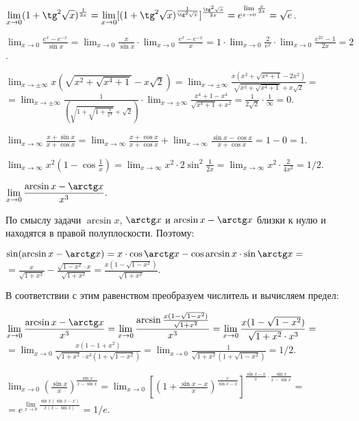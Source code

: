\documentclass[a5paper,10pt]{article}
\begin{document}
\medskip
{} $\displaystyle\lim_{x\to 0}
(1+\tg^2\sqrt{x})^{\frac{1}{2x}}=
\lim_{x\to 0}[(1+\tg^2\sqrt{x})^{\frac{1}{\tg^2\sqrt x}}]^
{\frac{\tg^2\sqrt x}{2x}}=
e^{\lim\limits_{x\to 0}\frac{x}{2x}}=\sqrt e$.

\medskip
{} $\displaystyle\lim_{x\to 0}
\frac{e^x-e^{-x}}{\sin x}=\lim_{x\to 0}\frac{x}{\sin x}\cdot
\lim_{x\to 0}\frac{e^x-e^{-x}}{x}=
1\cdot\lim_{x\to 0}\frac{2}{e^x}\cdot\lim_{x\to 0}\frac{e^{2x}-1}{2x}=2$.

\medskip
{} $\displaystyle\lim_{x\to \pm\infty}
x(\sqrt{x^2+\sqrt{x^4+1}}-x\sqrt2)=
\lim_{x\to \pm\infty}\frac{x(x^2+\sqrt{x^4+1}-2x^2)}
{\sqrt{x^2+\sqrt{x^4+1}}+x\sqrt2}=$\\
$\displaystyle=\lim_{x\to \pm\infty}\frac{1}{\left(\sqrt{1+\sqrt{1+\frac{1}{x^4}}}+\sqrt2\right)}\cdot
\lim_{x\to \pm\infty}\frac{x^4+1-x^4}{\sqrt{x^4+1}+x^2}=
\frac{1}{2\sqrt2}\cdot\frac{1}{\infty}=0$.

\medskip
{} $\displaystyle\lim_{x\to\infty}
\frac{x+\sin x}{x+\cos x}=\lim_{x\to\infty}\frac{x+\cos x}{x+\cos x}+
\lim_{x\to\infty}\frac{\sin x-\cos x}{x+\cos x}=1-0=1$.

\medskip
{} $\displaystyle\lim_{x\to \infty}
x^2(1-\cos\frac{1}{x})=\lim_{x\to\infty}x^2\cdot2\sin^2\frac{1}{2x}=
\lim_{x\to\infty}x^2\cdot\frac{2}{4x^2}=1/2$.

\medskip
{} $\displaystyle\lim_{x\to 0}
\frac{\arcsin x-\arctg x}{x^3}.$

\noindent
По смыслу задачи $\arcsin x$, $\arctg x$ и $\arcsin x-\arctg x$
близки к нулю и находятся в правой полуплоскости. Поэтому:

\noindent
$\displaystyle\sin(\arcsin x-\arctg x)=
x\cdot\cos\arctg x-\cos\arcsin x\cdot\sin\arctg x=$\\
$\displaystyle =\frac{x}{\sqrt{1+x^2}}-\frac{\sqrt{1-x^2}\cdot x}{\sqrt{1+x^2}}=
\frac{x(1-\sqrt{1-x^2})}{\sqrt{1+x^2}}$.

\noindent
В соответствии с этим равенством преобразуем числитель и вычисляем предел:

\noindent
$\displaystyle\lim_{x\to 0}\frac{\arcsin x-\arctg x}{x^3}=
\lim_{x\to 0}\frac{\arcsin\frac{x(1-\sqrt{1-x^2})}{\sqrt{1+x^2}}}{x^3}=
\lim_{x\to 0}\frac{x(1-\sqrt{1-x^2})}{\sqrt{1+x^2}\cdot x^3}=$\\
$\displaystyle=\lim_{x\to 0}\frac{x(1-1+x^2)}{\sqrt{1+x^2}\cdot x^3(1+\sqrt{1-x^2})}=
\lim_{x\to 0}\frac{1}{\sqrt{1+x^2}(1+\sqrt{1-x^2})}=1/2$.


 $\displaystyle\lim_{x\to 0}
\left(\frac{\sin x}{x}\right)^{\frac{\sin x}{x-\sin x}}=
\lim_{x\to 0}\left[\left(1+\frac{\sin x-x}{x}\right)^{\frac{x}{\sin x-x}}\right]^
{\frac{\sin x-x}{x}\cdot\frac{\sin x}{x-\sin x}}=$\\
$\displaystyle=e^{\lim\limits_{x\to 0}\frac{\sin x(\sin x-x)}{x(x-\sin x)}}=1/e$.

\bigskip
{}
\end{document}
